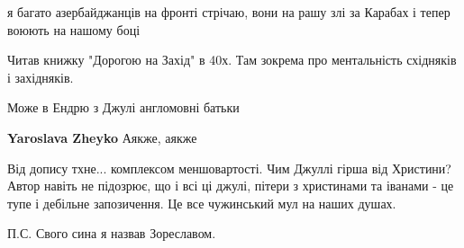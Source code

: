 \begin{itemize}
\begin{itemize}
 
я багато азербайджанців на фронті стрічаю, вони на рашу злі за Карабах і тепер воюють на нашому боці
\end{itemize}

 
Читав книжку "Дорогою на Захід" в 40х. Там зокрема про ментальність східняків і західняків.

 
Може в Ендрю з Джулі англомовні батьки

\begin{itemize}
 
\textbf{Yaroslava Zheyko} Аякже, аякже \Laughey[1.0][white]
\end{itemize}

 

Від допису тхне... комплексом меншовартості. Чим Джуллі гірша від Христини? Автор
навіть не підозрює, що і всі ці джулі, пітери з христинами та іванами - це тупе і
дебільне запозичення. Це все чужинський мул на наших душах.

П.С. Свого сина я назвав Зореславом.

\begin{itemize}
 

\end{itemize}
\end{itemize}
